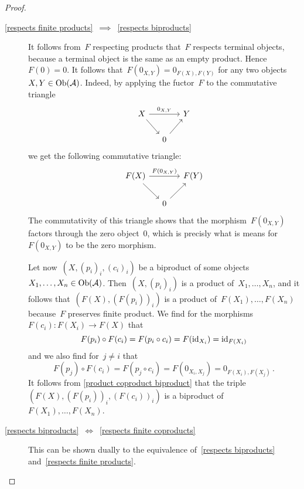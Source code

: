 \begin{proof}
\begin{enumerate}
\begin{description}
        \item[\ref*{respects finite products}~$\implies$~\ref*{respects biproducts}]
          It follows from~$F$ respecting products that~$F$ respects terminal objects, because a terminal object is the same as an empty product.
          Hence~$F(0) = 0$.
          It follows that~$F(0_{X,Y}) = 0_{F(X), F(Y)}$ for any two objects~$X, Y \in \operatorname{Ob}(\mathcal{A})$.
          Indeed, by applying the fuctor~$F$ to the commutative triangle
          \[
            \begin{tikzcd}[column sep = small]
                X
                \arrow{rr}[above]{0_{X,Y}}
                \arrow{dr}
              & {}
              & Y
              \\
                {}
              & 0
                \arrow{ur}
              & {}
            \end{tikzcd}
          \]
          we get the following commutative triangle:
          \[
            \begin{tikzcd}[column sep = small]
                F(X)
                \arrow{rr}[above]{F(0_{X,Y})}
                \arrow{dr}
              & {}
              & F(Y)
              \\
                {}
              & 0
                \arrow{ur}
              & {}
            \end{tikzcd}
          \]
          The commutativity of this triangle shows that the morphism~$F(0_{X,Y})$ factors through the zero object~$0$, which is precisly what is means for~$F(0_{X,Y})$ to be the zero morphism.
          
          Let now~$(X, (p_i)_i, (c_i)_i)$ be a biproduct of some objects~$X_1, \dotsc, X_n \in \operatorname{Ob}(\mathcal{A})$.
          Then~$(X, (p_i)_i)$ is a product of~$X_1, \dotsc, X_n$, and it follows that~$(F(X), (F(p_i))_i)$ is a product of~$F(X_1), \dotsc, F(X_n)$ because~$F$ preserves finite product.
          We find for the morphisms~$F(c_i) \colon F(X_i) \to F(X)$ that
          \[
              F(p_i) \circ F(c_i)
            = F(p_i \circ c_i)
            = F( \operatorname{id}_{X_i} )
            = \operatorname{id}_{F(X_i)}
          \]
          and we also find for~$j \neq i$ that
          \[
              F(p_j) \circ F(c_i)
            = F(p_j \circ c_i)
            = F(0_{X_i, X_j})
            = 0_{F(X_i), F(X_j)} \,.
          \]
          It follows from \cref{product coproduct biproduct} that the triple~$(F(X), (F(p_i))_i, (F(c_i))_i)$ is a biproduct of~$F(X_1), \dotsc, F(X_n)$.
          
        \item[\ref*{respects biproducts}~$\iff$~\ref*{respects finite coproducts}]
          This can be shown dually to the equivalence of~\ref*{respects biproducts} and~\ref*{respects finite products}.
        

\end{description}
\end{enumerate}
\end{proof}
